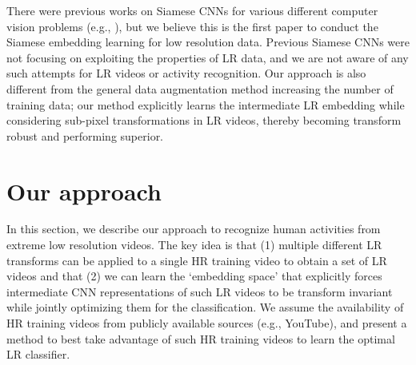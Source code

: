 \documentclass[letterpaper]{article} %
\begin{document}
There were previous works on Siamese CNNs for various different computer vision problems (e.g., \cite{hadsell2006dimensionality,bell15siggraph,wang2015unsupervised}), but we believe this is the first paper to conduct the Siamese embedding learning for low resolution data. Previous Siamese CNNs were not focusing on exploiting the properties of LR data, and we are not aware of any such  attempts for LR videos or activity recognition. Our approach is also different from the general data augmentation method increasing the number of training data; our method explicitly learns the intermediate LR embedding while considering sub-pixel transformations in LR videos, thereby becoming transform robust and performing superior.






\section{Our approach}

In this section, we describe our approach to recognize human activities from extreme low resolution videos. The key idea is that (1) multiple different LR transforms can be applied to a single HR training video to obtain a set of LR videos and that (2) we can learn the `embedding space' that explicitly forces intermediate CNN representations of such LR videos to be transform invariant while jointly optimizing them for the classification. We assume the availability of HR training videos from publicly available sources (e.g., YouTube), and present a method to best take advantage of such HR training videos to learn the optimal LR classifier.

\end{document}
